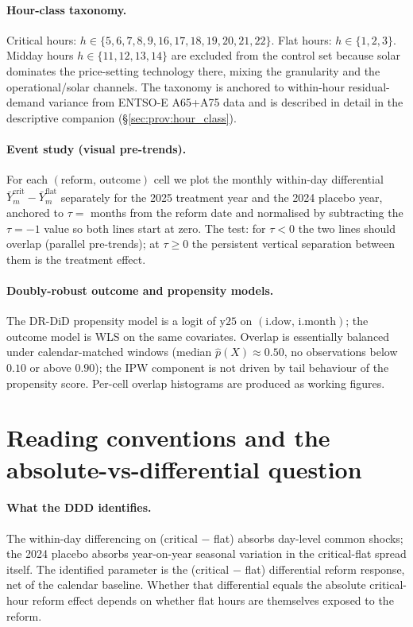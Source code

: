 \documentclass[11pt,a4paper]{article}
\begin{document}
\paragraph{Hour-class taxonomy.} Critical hours: $h \in \{5,6,7,8,9,16,17,18,19,20,21,22\}$. Flat hours: $h \in \{1,2,3\}$. Midday hours $h \in \{11,12,13,14\}$ are excluded from the control set because solar dominates the price-setting technology there, mixing the granularity and the operational/solar channels. The taxonomy is anchored to within-hour residual-demand variance from ENTSO-E A65+A75 data and is described in detail in the descriptive companion (\S\ref{sec:prov:hour_class}).

\paragraph{Event study (visual pre-trends).} For each $(\text{reform},\,\text{outcome})$ cell we plot the monthly within-day differential $\bar Y^{\text{crit}}_m - \bar Y^{\text{flat}}_m$ separately for the 2025 treatment year and the 2024 placebo year, anchored to $\tau = $ months from the reform date and normalised by subtracting the $\tau = -1$ value so both lines start at zero. The test: for $\tau < 0$ the two lines should overlap (parallel pre-trends); at $\tau \ge 0$ the persistent vertical separation between them is the treatment effect.

\paragraph{Doubly-robust outcome and propensity models.} The DR-DiD propensity model is a logit of $\text{y25}$ on $(\text{i.dow},\,\text{i.month})$; the outcome model is WLS on the same covariates. Overlap is essentially balanced under calendar-matched windows (median $\hat p(X) \approx 0.50$, no observations below $0.10$ or above $0.90$); the IPW component is not driven by tail behaviour of the propensity score. Per-cell overlap histograms are produced as working figures.

\section{Reading conventions and the absolute-vs-differential question}\label{sec:ident:reading_DDD}

\paragraph{What the DDD identifies.} The within-day differencing on (critical $-$ flat) absorbs day-level common shocks; the 2024 placebo absorbs year-on-year seasonal variation in the critical-flat spread itself. The identified parameter is the (critical $-$ flat) differential reform response, net of the calendar baseline. Whether that differential equals the absolute critical-hour reform effect depends on whether flat hours are themselves exposed to the reform.
\end{document}
